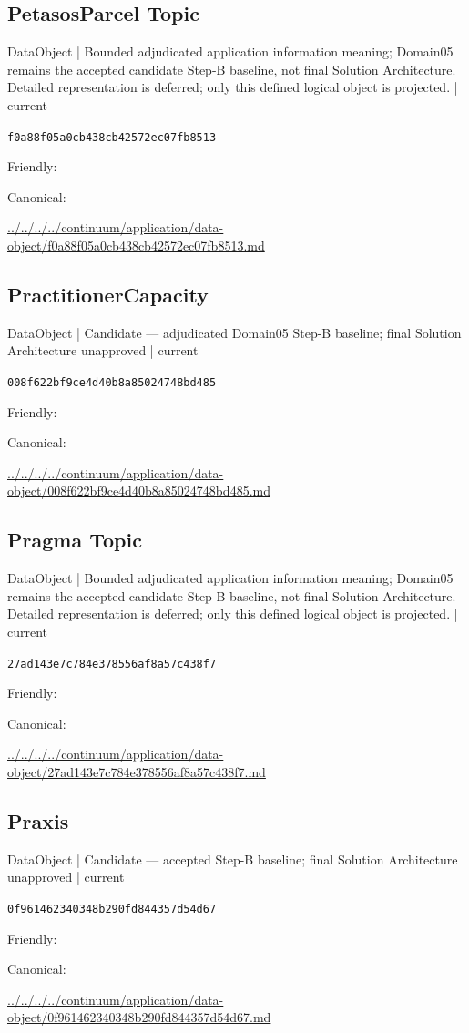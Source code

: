 \documentclass[10pt,a4paper]{article}
\begin{document}
\subsection*{PetasosParcel Topic}
{\small DataObject | Bounded adjudicated application information meaning; Domain05 remains the accepted candidate Step-B baseline, not final Solution Architecture. Detailed representation is deferred; only this defined logical object is projected. | current}\par
\texttt{f0a88f05a0cb438cb42572ec07fb8513}\par
Friendly: \par
Canonical: \par
{\footnotesize\url{../../../../continuum/application/data-object/f0a88f05a0cb438cb42572ec07fb8513.md}}\par
\subsection*{PractitionerCapacity}
{\small DataObject | Candidate — adjudicated Domain05 Step-B baseline; final Solution Architecture unapproved | current}\par
\texttt{008f622bf9ce4d40b8a85024748bd485}\par
Friendly: \par
Canonical: \par
{\footnotesize\url{../../../../continuum/application/data-object/008f622bf9ce4d40b8a85024748bd485.md}}\par
\subsection*{Pragma Topic}
{\small DataObject | Bounded adjudicated application information meaning; Domain05 remains the accepted candidate Step-B baseline, not final Solution Architecture. Detailed representation is deferred; only this defined logical object is projected. | current}\par
\texttt{27ad143e7c784e378556af8a57c438f7}\par
Friendly: \par
Canonical: \par
{\footnotesize\url{../../../../continuum/application/data-object/27ad143e7c784e378556af8a57c438f7.md}}\par
\subsection*{Praxis}
{\small DataObject | Candidate — accepted Step-B baseline; final Solution Architecture unapproved | current}\par
\texttt{0f961462340348b290fd844357d54d67}\par
Friendly: \par
Canonical: \par
{\footnotesize\url{../../../../continuum/application/data-object/0f961462340348b290fd844357d54d67.md}}\par
\end{document}
